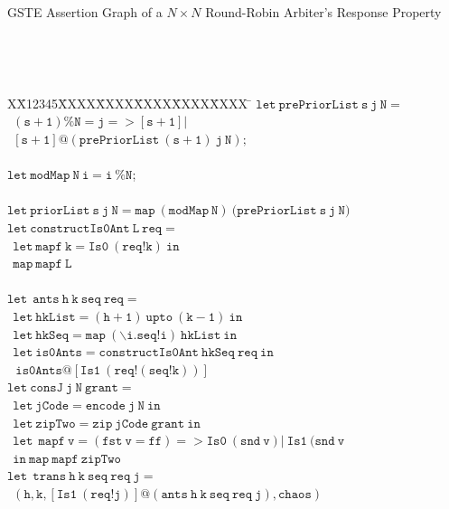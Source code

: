 \documentclass[final]{IEEEtran}
\newlength{\fminilength}
\newenvironment{fmini}[1][\linewidth]
  {\setlength{\fminilength}{#1\fboxsep-2\fboxrule}%
   \vspace{2ex}\noindent\begin{lrbox}{\fminibox}\begin{minipage}{\fminilength}%
   \mbox{ }\hfill\vspace{-2.5ex}}%
  {\end{minipage}\end{lrbox}\vspace{1ex}\hspace{0ex}%
   \framebox{\usebox{\fminibox}}}
\newenvironment{specification}
{\noindent\footnotesize\tt\begin{fmini}\begin{tabbing}X\=X12345\=XXXX\=XXXX\=XXXX\=XXXX\=XXXX
\=\+\kill} {\end{tabbing}\normalfont\end{fmini}}
\begin{document}
\begin{table}
\caption{GSTE Assertion Graph of a $N \times N$ Round-Robin
Arbiter's Response Property } \label{tab:GSTEGraphLiveness}
\begin{specification}
$\mathtt{let\ prePriorList\ s\ j\ N=}$\\
     $\ \ \mathtt{(s + 1) \% N =j =>  [s+1]|}$\\
    $\ \ \mathtt{ [s+1]@ (prePriorList\ (s +1)\ j\ N);}$\\
    \\
$\mathtt{let\ modMap\ N\ i= i\ \% N}$;\\
\\


$\mathtt{let\ priorList\ s\ j\ N= map\ (modMap\ N)} \
(\mathtt{prePriorList\ s\ j\ N)}$\\

$\mathtt{let\ constructIs0Ant\ L\ req=}$\\
 $\ \  \mathtt{  let\ mapf\  k =
 Is0\  (req !k )\ in}$\\
 $\ \  \mathtt{  map\ mapf\ L}$\\
\\
$\mathtt{let\  \ ants\  h\ k\  seq\ req=}$\\
    $\ \ \mathtt{let\ hkList=(h + 1)\ upto \ (k - 1)\ in}$\\
    $\ \ \mathtt{let\ hkSeq=map\ (\backslash i. seq!i) \ hkList\ in}$\\
    $\ \ \mathtt{let\ is0Ants=constructIs0Ant\ hkSeq\    req\ in}$\\
 $\ \  \mathtt{\ is0Ants@[Is1\ (req ! (seq!k))]}$\\

$\mathtt{let\ consJ\  j\ N\ grant=}$\\
    $\ \ \mathtt{  let\    jCode=encode\ j\ N\ in}$\\
    $\ \ \mathtt{  let\    zipTwo=zip\ jCode\ grant\ in}$\\
    $\ \  \mathtt{ let\  \   mapf\ v=(fst\ v=ff)  =>Is0\ (snd\ v)%
   |\ Is1\ (snd\ v}$\\
$  \mathtt{\ \ in\ map\ mapf\ zipTwo}$\\

$\mathtt{let\  \ trans\  h\ k\  seq\ req\ j=}$\\
     $\ \  \mathtt{(h,k,[ Is1\ (req ! j)] @(ants\  h\ k\  seq\ req\ j), chaos)}$\\
\\


\end{specification}
\end{table}
\end{document}
